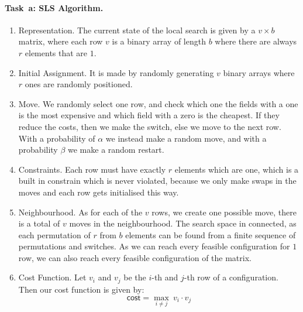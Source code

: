 \paragraph{Task~a: SLS Algorithm.}
\begin{enumerate}
\item Representation. 
The current state of the local search is given by a $v \times b$ matrix, where each row $v$ is a binary array of length $b$ where there are always $r$ elements that are $1$. 

  
\item Initial Assignment. It is made by randomly generating $v$ binary arrays where $r$ ones are randomly positioned. %
\item Move. We randomly select one row, and check which one the fields with a one is the most expensive and which field with a zero is the cheapest. If they reduce the costs, then we make the switch, else we move to the next row. With a probability of $\alpha$ we instead make a random move, and with a probability $\beta$ we make a random restart. 
\item Constraints. Each row must have exactly $r$ elements which are one, which is a built in constrain which is never violated, because we only make swaps in the moves and each row gets initialised this way. 
\item Neighbourhood. As for each of the $v$ rows, we create one possible move, there is a total of $v$ moves in the neighbourhood. The search space in connected, as each permutation of $r$ from $b$ elements can be found from a finite sequence of permutations and switches. As we can reach every feasible configuration for $1$ row, we can also reach every feasible configuration of the matrix. 
\item Cost Function. Let $v_i$ and $v_j$ be the $i$-th and $j$-th row of a configuration. Then our cost function is given by: 
\begin{equation*}
 \mathsf{cost} = \max_{i \neq j}\: v_i \cdot v_j 
\end{equation*}


\end{enumerate}
